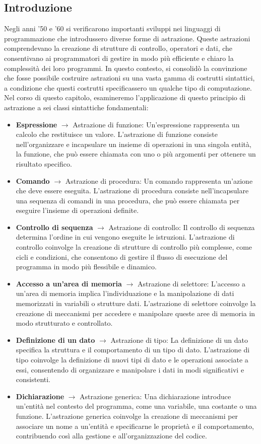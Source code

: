 \documentclass{article}
\begin{document}
	\subsection{Introduzione}
	Negli anni '50 e '60 si verificarono importanti sviluppi nei linguaggi di programmazione che introdussero diverse forme di astrazione. Queste astrazioni comprendevano la creazione di strutture di controllo, operatori e dati, che consentivano ai programmatori di gestire in modo più efficiente e chiaro la complessità dei loro programmi.
	In questo contesto, si consolidò la convinzione che fosse possibile costruire astrazioni su una vasta gamma di costrutti sintattici, a condizione che questi costrutti specificassero un qualche tipo di computazione.
	\\
	Nel corso di questo capitolo, esamineremo l'applicazione di questo principio di astrazione a sei classi sintattiche fondamentali:
	\begin{itemize}
		\item \textbf{Espressione} $\rightarrow$ Astrazione di funzione: Un'espressione rappresenta un calcolo che restituisce un valore. L'astrazione di funzione consiste nell'organizzare e incapsulare un insieme di operazioni in una singola entità, la funzione, che può essere chiamata con uno o più argomenti per ottenere un risultato specifico.
		\item \textbf{Comando} $\rightarrow$ Astrazione di procedura: Un comando rappresenta un'azione che deve essere eseguita. L'astrazione di procedura consiste nell'incapsulare una sequenza di comandi in una procedura, che può essere chiamata per eseguire l'insieme di operazioni definite.
		\item \textbf{Controllo di sequenza} $\rightarrow$ Astrazione di controllo: Il controllo di sequenza determina l'ordine in cui vengono eseguite le istruzioni. L'astrazione di controllo coinvolge la creazione di strutture di controllo più complesse, come cicli e condizioni, che consentono di gestire il flusso di esecuzione del programma in modo più flessibile e dinamico.
		\item \textbf{Accesso a un'area di memoria} $\rightarrow$ Astrazione di selettore: L'accesso a un'area di memoria implica l'individuazione e la manipolazione di dati memorizzati in variabili o strutture dati. L'astrazione di selettore coinvolge la creazione di meccanismi per accedere e manipolare queste aree di memoria in modo strutturato e controllato.
		\item \textbf{Definizione di un dato} $\rightarrow$ Astrazione di tipo: La definizione di un dato specifica la struttura e il comportamento di un tipo di dato. L'astrazione di tipo coinvolge la definizione di nuovi tipi di dato e le operazioni associate a essi, consentendo di organizzare e manipolare i dati in modi significativi e consistenti.
		\item \textbf{Dichiarazione} $\rightarrow$ Astrazione generica: Una dichiarazione introduce un'entità nel contesto del programma, come una variabile, una costante o una funzione. L'astrazione generica coinvolge la creazione di meccanismi per associare un nome a un'entità e specificarne le proprietà e il comportamento, contribuendo così alla gestione e all'organizzazione del codice.
	\end{itemize}
\end{document}
